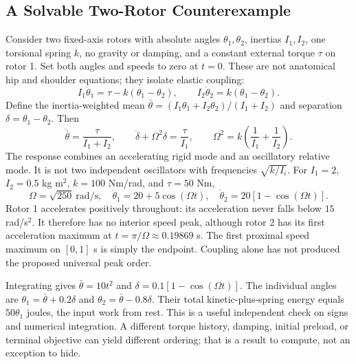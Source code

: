 \subsection{A Solvable Two-Rotor Counterexample}
Consider two fixed-axis rotors with absolute angles $\theta_1,\theta_2$, inertias $I_1,I_2$, one torsional spring $k$, no gravity or damping, and a constant external torque $\tau$ on rotor 1. Set both angles and speeds to zero at $t=0$. These are not anatomical hip and shoulder equations; they isolate elastic coupling:
\begin{equation}
I_1\ddot\theta_1=\tau-k(\theta_1-\theta_2),\qquad
I_2\ddot\theta_2=k(\theta_1-\theta_2).
\end{equation}
Define the inertia-weighted mean $\bar\theta=(I_1\theta_1+I_2\theta_2)/(I_1+I_2)$ and separation $\delta=\theta_1-\theta_2$. Then
\begin{equation}
\ddot{\bar\theta}=\frac{\tau}{I_1+I_2},\qquad
\ddot\delta+\Omega^2\delta=\frac{\tau}{I_1},\qquad
\Omega^2=k\left(\frac1{I_1}+\frac1{I_2}\right).
\end{equation}
The response combines an accelerating rigid mode and an oscillatory relative mode. It is not two independent oscillators with frequencies $\sqrt{k/I_i}$. For $I_1=2$, $I_2=0.5$ kg m$^2$, $k=100$ Nm/rad, and $\tau=50$ Nm,
\begin{equation}
\Omega=\sqrt{250}\ \mathrm{rad/s},\quad
\ddot\theta_1=20+5\cos(\Omega t),\quad
\ddot\theta_2=20[1-\cos(\Omega t)].
\end{equation}
Rotor 1 accelerates positively throughout: its acceleration never falls below $15$ rad/s$^2$. It therefore has no interior speed peak, although rotor 2 has its first acceleration maximum at $t=\pi/\Omega\approx0.19869$ s. The first proximal speed maximum on $[0,1]$ s is simply the endpoint. Coupling alone has not produced the proposed universal peak order.

Integrating gives $\bar\theta=10t^2$ and $\delta=0.1[1-\cos(\Omega t)]$. The individual angles are $\theta_1=\bar\theta+0.2\delta$ and $\theta_2=\bar\theta-0.8\delta$. Their total kinetic-plus-spring energy equals $50\theta_1$ joules, the input work from rest. This is a useful independent check on signs and numerical integration. A different torque history, damping, initial preload, or terminal objective can yield different ordering; that is a result to compute, not an exception to hide.

